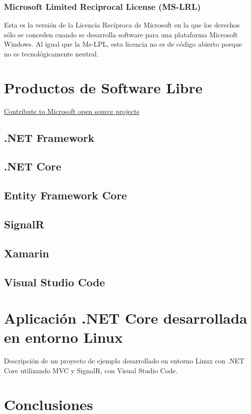 \documentclass[10pt, titlepage]{article}
\begin{document}
\subsubsection{Microsoft Limited Reciprocal License (MS-LRL)}
Esta es la versión de la Licencia Recíproca de Microsoft en la que los derechos sólo se conceden cuando se desarrolla software para una plataforma Microsoft Windows. Al igual que la Ms-LPL, esta licencia no es de código abierto porque no es tecnológicamente neutral.
\section{Productos de Software Libre}
\href{https://opensource.microsoft.com/explore}{Contribute to Microsoft open source projects}
\subsection{.NET Framework}
\subsection{.NET Core}
\subsection{Entity Framework Core}
\subsection{SignalR}
\subsection{Xamarin}
\subsection{Visual Studio Code}

\section{Aplicación .NET Core desarrollada en entorno Linux}
Descripción de un proyecto de ejemplo desarrollado en entorno Linux con .NET Core utilizando MVC y SignalR, con Visual Studio Code.

\section{Conclusiones}

\clearpage


\end{document}
